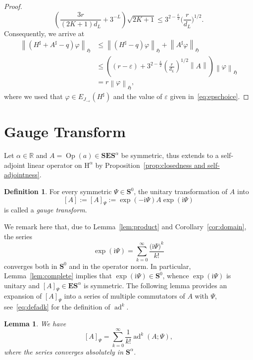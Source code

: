 \documentclass[10pt]{amsart}
\newtheorem{lemm}[theo]{Lemma}\newtheorem{prop}[theo]{Proposition}\newtheorem{coro}[theo]{Corollary}\newtheorem{conj}[theo]{Conjecture}
\theoremstyle{definition}\newtheorem{defi}[theo]{Definition}\newtheorem{rema}[theo]{Remark}\newtheorem{exam}[theo]{Example}\newtheorem{nota}[theo]{Notation}
\DeclareMathOperator{\ad}{ad}
\DeclareMathOperator{\Op}{Op}
\newcommand{\rmi}{\mathrm{i}}
\renewcommand{\mathsf}{\mathrm}
\newcommand{\sfH}{\mathsf{H}}
\newcommand{\R}{\mathbb R}
\newcommand{\BE}{\mathbf E}
\newcommand{\BS}{\mathbf S}
\newcommand{\FH}{\mathfrak H}
\renewcommand{\phi}{\varphi}
\newcommand{\eps}{\varepsilon}
\newcommand{\norm}[1]{\left\| #1 \right\|}
\begin{document}
\begin{proof}
\begin{equation}\label{eq:boundsecterm}
\left(\frac{3r}{(2K + 1)d_L} + 3^{-L}\right)\sqrt{2K+1} \le 3^{2 -
\frac{L}{2}} \Big(\frac{r}{d_L}\Big)^{1/2}.
\end{equation}
Consequently, we arrive at
\begin{equation}\label{eq:therightthing}
\begin{split}
\norm{\left(H^\sharp + A^\sharp - q\right) \phi}_\FH &\le \norm{\left(H^\sharp - q\right)
\phi}_\FH+ \norm{A^\sharp\phi}_\FH \\
&\le \left((r - \eps) + 3^{2 - \frac{L}{2}} \left(\frac{r}{d_L}\right)^{1/2}\norm{A}\right)
\norm{\phi}_\FH\\
&= r \norm \phi_\FH,
\end{split}
\end{equation}
where we used that $\phi\in E_{J_{-\eps}}(H^\sharp)$ and the value of $\eps$ given in~\eqref{eq:epschoice}.
\end{proof}

\section{Gauge Transform}\label{sec:gt}

Let $\alpha\in \R$ and $A = \Op(a) \in \BS\BE\BS^\alpha$ be symmetric, thus extends to a self-adjoint linear operator on $\sfH^{\alpha}$ by Proposition~\ref{prop:closedness and self-adjointness}.

\begin{defi}
For every symmetric $\Psi\in\BS^0$, the unitary transformation of $A$ into
\[
[A] := [A]_\Psi := \exp(- \rmi \Psi) A \exp(\rmi \Psi)
\]
is called a
\emph{gauge transform}.
\end{defi}

\noindent We remark here that, due to Lemma~\ref{lem:product} and Corollary~\ref{cor:domain}, the series
\begin{equation}\label{eq:exppsi}
\exp(\rmi\Psi)=\sum\limits_{k=0}^\infty \frac{\big(\rmi\Psi\big)^k}{k!}
\end{equation}
converges both in $\BS^0$ and in the operator norm. In particular, Lemma~\ref{lem:complete} implies that $\exp(\rmi\Psi)\in\BS^0$, whence $\exp(\rmi\Psi)$ is unitary and $[A]_\Psi\in\BE\BS^\alpha$ is symmetric. The following lemma provides an expansion of $[A]_\Psi$ into a series of multiple commutators of $A$ with $\Psi$, see~\eqref{eq:defadk} for the definition of $\ad^k$.
\begin{lemm}\label{lem:A'series}
We have
\begin{equation}\label{eq:H'formalseries}
[A]_\Psi = \sum_{k = 0}^\infty \frac{1}{k!}\ad^k(A;\Psi),
\end{equation}
where the series converges absolutely in $\BS^\alpha$.
\end{lemm}
\end{document}
